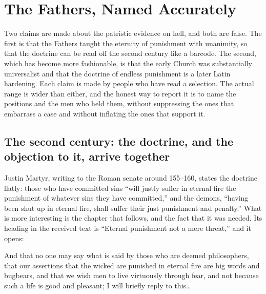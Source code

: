 \section{The Fathers, Named Accurately}

Two claims are made about the patristic evidence on hell, and both are false. The first is that the Fathers taught the eternity of punishment with unanimity, so that the doctrine can be read off the second century like a barcode. The second, which has become more fashionable, is that the early Church was substantially universalist and that the doctrine of endless punishment is a later Latin hardening. Each claim is made by people who have read a selection. The actual range is wider than either, and the honest way to report it is to name the positions and the men who held them, without suppressing the ones that embarrass a case and without inflating the ones that support it.

\subsection{The second century: the doctrine, and the objection to it, arrive together}

Justin Martyr, writing to the Roman senate around 155--160, states the doctrine flatly: those who have committed sins ``will justly suffer in eternal fire the punishment of whatever sins they have committed,'' and the demons, ``having been shut up in eternal fire, shall suffer their just punishment and penalty.'' What is more interesting is the chapter that follows, and the fact that it was needed. Its heading in the received text is ``Eternal punishment not a mere threat,'' and it opens:

\begin{studyframe}
And that no one may say what is said by those who are deemed philosophers, that our assertions that the wicked are punished in eternal fire are big words and bugbears, and that we wish men to live virtuously through fear, and not because such a life is good and pleasant; I will briefly reply to this\ldots{}
\end{studyframe}

